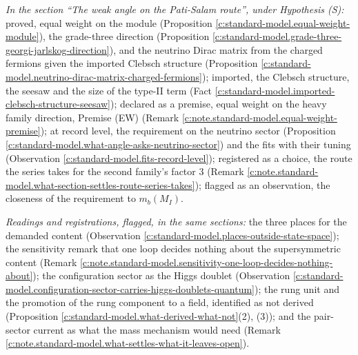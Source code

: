 \documentclass[11pt]{article}
\theoremstyle{definition}
\theoremstyle{plain}
\begin{document}
\emph{In the section ``The weak angle on the Pati-Salam route'', under Hypothesis (S):} proved, equal weight on the module (Proposition \ref{c:standard-model.equal-weight-module}), the grade-three direction (Proposition \ref{c:standard-model.grade-three-georgi-jarlskog-direction}), and the neutrino Dirac matrix from the charged fermions given the imported Clebsch structure (Proposition \ref{c:standard-model.neutrino-dirac-matrix-charged-fermions}); imported, the Clebsch structure, the seesaw and the size of the type-II term (Fact \ref{c:standard-model.imported-clebsch-structure-seesaw}); declared as a premise, equal weight on the heavy family direction, Premise (EW) (Remark \ref{c:note.standard-model.equal-weight-premise}); at record level, the requirement on the neutrino sector (Proposition \ref{c:standard-model.what-angle-asks-neutrino-sector}) and the fits with their tuning (Observation \ref{c:standard-model.fits-record-level}); registered as a choice, the route the series takes for the second family's factor $3$ (Remark \ref{c:note.standard-model.what-section-settles-route-series-takes}); flagged as an observation, the closeness of the requirement to $m_{b}(M_{I})$.

\emph{Readings and registrations, flagged, in the same sections:} the three places for the demanded content (Observation \ref{c:standard-model.places-outside-state-space}); the sensitivity remark that one loop decides nothing about the supersymmetric content (Remark \ref{c:note.standard-model.sensitivity-one-loop-decides-nothing-about}); the configuration sector as the Higgs doublet (Observation \ref{c:standard-model.configuration-sector-carries-higgs-doublets-quantum}); the rung unit and the promotion of the rung component to a field, identified as not derived (Proposition \ref{c:standard-model.what-derived-what-not}(2), (3)); and the pair-sector current as what the mass mechanism would need (Remark \ref{c:note.standard-model.what-settles-what-it-leaves-open}).
\end{document}
